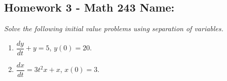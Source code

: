 \documentclass[10pt]{article}
\begin{document}
\pagestyle{empty}
\subsection*{Homework 3 - Math 243 \hfill Name: \underline{\hspace*{2in}}}


\noindent
\textit{Solve the following initial value problems using separation of variables.}

\begin{multicols}{2}
\begin{enumerate}
\setcounter{enumi}{\theenumCount}
\item $\dfrac{dy}{dt} + y = 5$, $y(0) = 20$.


\item $\dfrac{dx}{dt} = 3t^2 x + x$, $x(0) = 3$.

\setcounter{enumCount}{\theenumi}
\end{enumerate} 
\end{multicols}
\vfill

\noindent
\end{document}
